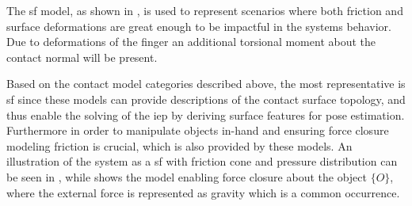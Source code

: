 The \gls{sf} model, as shown in , is used to represent scenarios where both friction and surface deformations are great enough to be impactful in the systems behavior. Due to deformations of the finger an additional torsional moment about the contact normal will be present\cite[Chapter 38]{handbook-of-robotics}. \medskip

Based on the contact model categories described above, the most representative is \gls{sf} since these models can provide descriptions of the contact surface topology, and thus enable the solving of the \gls{iep} by deriving surface features for pose estimation. Furthermore in order to manipulate objects in-hand and ensuring force closure modeling friction is crucial, which is also provided by these models. An illustration of the system as a \gls{sf} with friction cone and pressure distribution can be seen in , while  shows the model enabling force closure about the object $\{O\}$, where the external force is represented as gravity which is a common occurrence.

